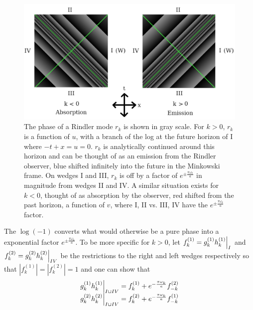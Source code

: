\documentclass[12pt,a4paper]{article}
\newcommand\restr[2]{{%
  \left.\kern-\nulldelimiterspace %
  #1 %
  \vphantom{\big|} %
  \right|_{#2} %
  }}
\begin{document}
\begin{figure}[h]
  \centering
  \captionsetup{width=0.8\linewidth}
\includegraphics[scale=0.3]{analytic.png}
\caption{The phase of a Rindler mode $r_k$ is shown in gray scale. For $k>0$, $r_k$ is a function of $u$, with a branch of the log at the future horizon of I where $-t + x = u = 0$. $r_k$ is analytically continued around this horizon and can be thought of as an emission from the Rindler observer, blue shifted infinitely into the future in the Minkowski frame. On wedges I and III, $r_k$ is off by a factor of $e^{\pm \frac{\pi \omega_k}{a}}$ in magnitude from wedges II and IV.  A similar situation exists for $k<0$, thought of as absorption by the observer, red shifted from the past horizon, a function of $v$, where I, II vs. III, IV have the $e^{\pm \frac{\pi \omega_k}{a}}$ factor.}
\label{analytic}
\end{figure}

The $\log(-1)$ converts what would otherwise be a pure phase into a exponential factor $e^{\pm \frac{\pi \omega_k}{a}}$.  To be more specific for $k>0$, let $f_k^{(1)} = \restr{g_k^{(1)} h_k^{(1)}}{I}$ and $f_k^{(2)} = \restr{g_k^{(2)} h_k^{(2)}}{IV}$ be the restrictions to the right and left wedges respectively so that $\left|f_k^{(1)}\right| = \left|f_k^{(2)}\right| = 1$ and one can show that
\begin{equation}
  \begin{array}{l}
    \restr{g_k^{(1)} h_k^{(1)}}{I \cup IV} = f_k^{(1)} + e^{- \frac{\pi \omega_k}{a}} f_{-k}^{(2)} \\
    \restr{g_k^{(2)} h_k^{(2)}}{I \cup IV} = f_k^{(2)} + e^{- \frac{\pi \omega_k}{a}} f_{-k}^{(1)}
  \end{array}
\end{equation}
\end{document}
